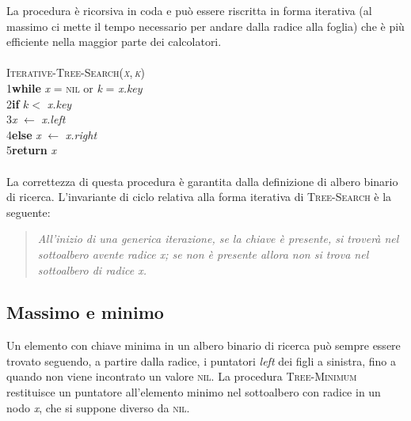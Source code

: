 \documentclass[10pt, a4paper]{report}
\newcommand\firsttab[1][0.5cm]{\hspace*{#1}}
\newcommand\secondtab[1][1cm]{\hspace*{#1}}
\newcommand\thirdtab[1][1.5cm]{\hspace*{#1}}
\begin{document}
La procedura è  ricorsiva in coda e può essere riscritta in forma iterativa (al massimo ci mette il tempo necessario per andare dalla radice alla foglia) che è più efficiente nella maggior parte dei calcolatori.\\\\
\textsc{Iterative-Tree-Search(\textit{x},\,\textit{k})}\\
1\firsttab\textbf{while} \textit{x} = \textsc{nil} or \textit{k} = \textit{x.key}\\
2\secondtab\textbf{if} $k < $ \textit{x.key}\\
3\thirdtab\textit{x} $\leftarrow$ \textit{x.left}\\
4\secondtab\textbf{else} \textit{x} $\leftarrow$ \textit{x.right}\\
5\firsttab\textbf{return} \textit{x}\\\\
La correttezza di questa procedura è garantita dalla definizione di albero binario di ricerca. L'invariante di ciclo relativa alla forma iterativa di  \textsc{Tree-Search} è la seguente:
\begin{quote}
\textit{All'inizio di una generica iterazione, se la chiave è presente, si troverà nel sottoalbero avente radice \textit{x}; se non è presente allora non si trova nel sottoalbero di radice \textit{x}.}
\end{quote}
\subsection{Massimo e minimo}
Un elemento con chiave minima in un albero binario di ricerca può sempre essere trovato seguendo, a partire dalla radice, i puntatori \textit{left} dei figli a sinistra, fino a quando non viene incontrato un valore \textsc{nil}. La procedura \textsc{Tree-Minimum} restituisce un puntatore all'elemento minimo nel sottoalbero con radice in un nodo \textit{x}, che si suppone diverso da \textsc{nil}.
\end{document}
